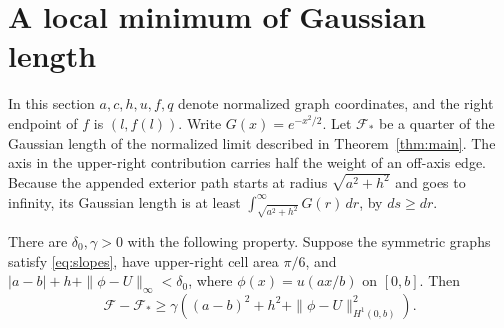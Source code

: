 \section{A local minimum of Gaussian length}\label{sec:coercivity}

In this section \(a,c,h,u,f,q\) denote normalized graph
coordinates, and the right endpoint of \(f\) is \((l,f(l))\).
Write \(G(x)=e^{-x^2/2}\). Let \(\mathcal F_*\) be a quarter
of the Gaussian length of the normalized limit described in
Theorem~\ref{thm:main}. The axis in the upper-right contribution
carries half the weight of an off-axis edge. Because the appended
exterior path starts at radius \(\sqrt{a^2+h^2}\) and goes to infinity,
its Gaussian length is at least
\(\int_{\sqrt{a^2+h^2}}^\infty G(r)\,dr\), by \(ds\ge dr\).

\begin{proposition}\label{prop:coercive}
There are \(\delta_0,\gamma>0\) with the following property. Suppose the
symmetric graphs satisfy \eqref{eq:slopes}, have upper-right cell area
\(\pi/6\), and \(|a-b|+h+\|\phi-U\|_\infty<\delta_0\), where
\(\phi(x)=u(ax/b)\) on \([0,b]\). Then
\begin{equation}
 \mathcal F-\mathcal F_*
 \ge \gamma\left((a-b)^2+h^2+\|\phi-U\|_{H^1(0,b)}^2\right).
 \label{eq:coercive}
\end{equation}
\end{proposition}

